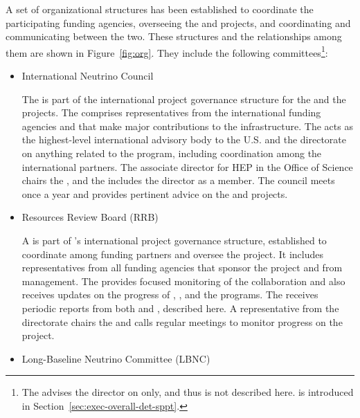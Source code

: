 A set  of  organizational structures  has been established  to
coordinate  the  participating  funding agencies,
overseeing the  and  projects,
and coordinating and communicating between the 
two. These structures and the relationships among them are shown 
in Figure~\ref{fig:org}. They include %
the following committees\footnote{The  advises the  director on  only, and thus is not described here.  is introduced in Section~\ref{sec:exec-overall-det-sppt}.}:
\begin{itemize}
\item International Neutrino Council 

The  is part of the international project governance structure for the   and the   projects. The  comprises representatives from the international funding agencies and   that make major contributions to the infrastructure. 
The  acts as the highest-level international advisory body to the U.S.   and the   directorate on anything related to the program, including coordination among the international partners. The associate director for HEP in the  Office of Science chairs the , and the  includes the   director as a member. The council meets once a year and provides pertinent advice on the  and   projects.

\item Resources Review Board (RRB)

A  is part of 's international project governance structure, %
established to coordinate among funding partners and oversee the  project. It includes representatives from all funding agencies that sponsor the project and  from  management. The   provides focused monitoring of the  collaboration and also receives updates on the progress of ,  , and the  programs. The   receives periodic reports from both  and , described here. %
A representative from the  directorate chairs the  and calls regular meetings to monitor progress on the  project.



\item Long-Baseline Neutrino Committee (LBNC)


\end{itemize}
